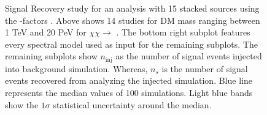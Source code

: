 \begin{figure}[t]
    \caption{Signal Recovery study for an analysis with 15 stacked sources using the \GS \J-factors \cite{Geringer_Sameth_2015}. Above shows 14 studies for DM mass ranging between 1 TeV and 20 PeV for $\chi\chi \rightarrow$ \parpar{\mu_\mu}. The bottom right subplot features every spectral model used as input for the remaining subplots. The remaining subplots show $n_\mathrm{inj}$ as the number of signal events injected into background simulation. Whereas, $n_s$ is the number of signal events recovered from analyzing the injected simulation. Blue line represents the median values of 100 simulations. Light blue bands show the $1\sigma$ statistical uncertainty around the median.}
    \label{fig:icDM_sigrecovery_1of2}
\end{figure}

\clearpage

